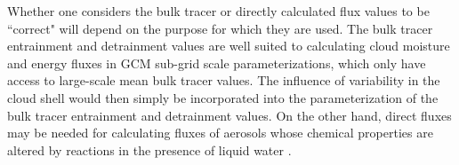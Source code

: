 \documentclass[draft,grl]{agutex}
\begin{document}
\begin{article}
Whether one considers the bulk tracer or directly calculated flux values to be 
``correct" will depend on the purpose for which they are used.  The bulk tracer 
entrainment and detrainment values are well suited to calculating cloud moisture 
and energy fluxes in GCM sub-grid scale parameterizations, which only have 
access to large-scale mean bulk tracer values.  The influence of variability 
in the cloud shell would then simply be incorporated into the parameterization 
of the bulk tracer entrainment and detrainment values.  On the other hand, 
direct fluxes may be needed for calculating fluxes of aerosols whose 
chemical properties are altered by reactions in the presence of liquid water 
\citep{Hoppel1994}.  


%
%
%
%
%
%


\end{article}
\end{document}
